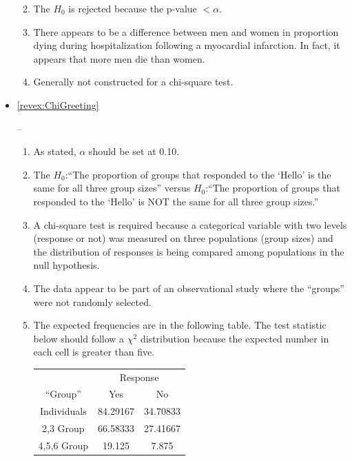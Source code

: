\documentclass[10pt,openany]{book}\usepackage[]{graphicx}\usepackage[]{color}
\newenvironment{knitrout}{}{} %
\begin{document}
\begin{itemize}
\begin{enumerate}
\begin{knitrout}
\end{knitrout}
      \item The $H_{0}$ is rejected because the p-value $<\alpha$.
      \item There appears to be a difference between men and women in proportion dying during hospitalization following a myocardial infarction.  In fact, it appears that more men die than women.
      \item Generally not constructed for a chi-square test.
    \end{enumerate}
  \item \hypertarget{ans:ChiGreeting}{\ref{revex:ChiGreeting}} --
    \begin{enumerate}
      \item As stated, $\alpha$ should be set at 0.10.
      \item The $H_{0}$:``The proportion of groups that responded to the `Hello' is the same for all three group sizes'' versus $H_{0}$:``The proportion of groups that responded to the `Hello' is NOT the same for all three group sizes.''
      \item A chi-square test is required because a categorical variable with two levels (response or not) was measured on three populations (group sizes) and the distribution of responses is being compared among populations in the null hypothesis.
      \item The data appear to be part of an observational study where the ``groups'' were not randomly selected.
      \item The expected frequencies are in the following table.  The test statistic below should follow a $\chi^{2}$ distribution because the expected number in each cell is greater than five.
        \begin{center}
          \begin{tabular}{|c|c|c|}
            \multicolumn{1}{c}{} & \multicolumn{2}{c}{Response} \\
            \cline{2-3}
            \multicolumn{1}{c|}{``Group''} & Yes & No \\
            \hline
            Individuals & 84.29167 & 34.70833 \\
            \hline
            2,3 Group & 66.58333 & 27.41667 \\
            \hline
            4,5,6 Group & 19.125 & 7.875 \\
            \hline
          \end{tabular}
        \end{center}

\end{enumerate}
\end{itemize}
\end{document}
